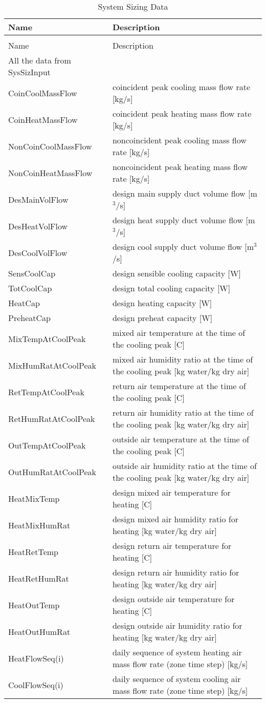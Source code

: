 \begin{longtable}[c]{p{2.0in}p{4.0in}}
\caption{System Sizing Data \label{table:system-sizing-data}} \tabularnewline
\toprule 
Name & Description \tabularnewline
\midrule
\endfirsthead

\caption[]{System Sizing Data} \tabularnewline
\toprule
Name & Description \tabularnewline
\midrule
\endhead

All the data from SysSizInput &  \tabularnewline
CoinCoolMassFlow & coincident peak cooling mass flow rate [kg/s] \tabularnewline
CoinHeatMassFlow & coincident peak heating mass flow rate [kg/s] \tabularnewline
NonCoinCoolMassFlow & noncoincident peak cooling mass flow rate [kg/s] \tabularnewline
NonCoinHeatMassFlow & noncoincident peak heating mass flow rate [kg/s] \tabularnewline
DesMainVolFlow & design main supply duct volume flow [m\(^{3}\)/s] \tabularnewline
DesHeatVolFlow & design heat supply duct volume flow [m\(^{3}\)/s] \tabularnewline
DesCoolVolFlow & design cool supply duct volume flow [m\(^{3}\)/s] \tabularnewline
SensCoolCap & design sensible cooling capacity [W] \tabularnewline
TotCoolCap & design total cooling capacity [W] \tabularnewline
HeatCap & design heating capacity [W] \tabularnewline
PreheatCap & design preheat capacity [W] \tabularnewline
MixTempAtCoolPeak & mixed air temperature at the time of the cooling peak [C] \tabularnewline
MixHumRatAtCoolPeak & mixed air humidity ratio at the time of the cooling peak [kg water/kg dry air] \tabularnewline
RetTempAtCoolPeak & return air temperature at the time of the cooling peak [C] \tabularnewline
RetHumRatAtCoolPeak & return air humidity ratio at the time of the cooling peak [kg water/kg dry air] \tabularnewline
OutTempAtCoolPeak & outside air temperature at the time of the cooling peak [C] \tabularnewline
OutHumRatAtCoolPeak & outside air humidity ratio at the time of the cooling peak [kg water/kg dry air] \tabularnewline
HeatMixTemp & design mixed air temperature for heating [C] \tabularnewline
HeatMixHumRat & design mixed air humidity ratio for heating [kg water/kg dry air] \tabularnewline
HeatRetTemp & design return air temperature for heating [C] \tabularnewline
HeatRetHumRat & design return air humidity ratio for heating [kg water/kg dry air] \tabularnewline
HeatOutTemp & design outside air temperature for heating [C] \tabularnewline
HeatOutHumRat & design outside air humidity ratio for heating [kg water/kg dry air] \tabularnewline
HeatFlowSeq(i) & daily sequence of system heating air mass flow rate (zone time step) [kg/s] \tabularnewline
CoolFlowSeq(i) & daily sequence of system cooling air mass flow rate (zone time step) [kg/s] \tabularnewline

\end{longtable}
